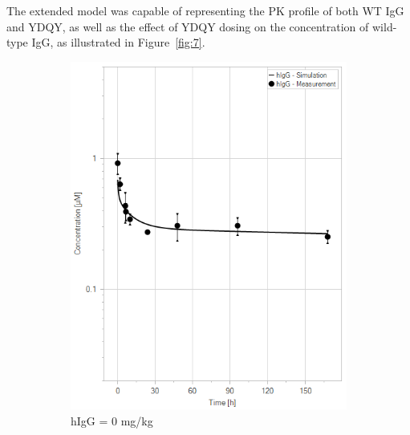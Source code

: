 \documentclass[fleqn,10pt]{physiome}
\begin{document}
The extended model was capable of representing the PK profile of both WT IgG and YDQY, as well as the effect of YDQY dosing on the concentration of wild-type IgG, as illustrated in Figure~\ref{fig:7}.

\begin{figure}[htb]\centering
    \begin{subfigure}{0.32\textwidth}
        \includegraphics[width=\textwidth]{pl11.png}
        \caption{hIgG = 0 mg/kg}
        \label{fig:7a}
    \end{subfigure}
    \hfill
    \begin{subfigure}{0.32\textwidth}

\end{subfigure}
\end{figure}
\end{document}
